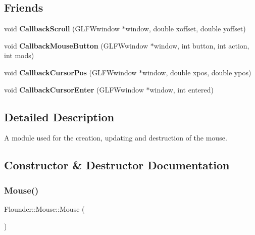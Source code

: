 \subsection*{Friends}
\begin{DoxyCompactItemize}
\item 
\mbox{\label{class_flounder_1_1_mouse_aee5a8dbd16ce86261875554a13ef59ec}} 
void {\bfseries Callback\+Scroll} (G\+L\+F\+Wwindow $\ast$window, double xoffset, double yoffset)
\item 
\mbox{\label{class_flounder_1_1_mouse_a498cfd3b97d00fe504bd87e6da0e549f}} 
void {\bfseries Callback\+Mouse\+Button} (G\+L\+F\+Wwindow $\ast$window, int button, int action, int mods)
\item 
\mbox{\label{class_flounder_1_1_mouse_a7ee2ff67e0052383c730cacca482d61b}} 
void {\bfseries Callback\+Cursor\+Pos} (G\+L\+F\+Wwindow $\ast$window, double xpos, double ypos)
\item 
\mbox{\label{class_flounder_1_1_mouse_ace750aa9de23fc87aab3bba135938e64}} 
void {\bfseries Callback\+Cursor\+Enter} (G\+L\+F\+Wwindow $\ast$window, int entered)
\end{DoxyCompactItemize}


\subsection{Detailed Description}
A module used for the creation, updating and destruction of the mouse. 



\subsection{Constructor \& Destructor Documentation}
\mbox{\label{class_flounder_1_1_mouse_a774ae57e1baf480bff486393af1eaca6}} 
\subsubsection{\texorpdfstring{Mouse()}{Mouse()}}
{\footnotesize\ttfamily Flounder\+::\+Mouse\+::\+Mouse (\begin{DoxyParamCaption}{ }\end{DoxyParamCaption})}



